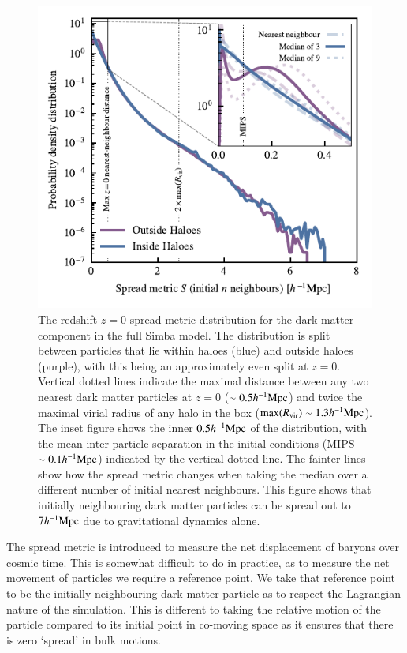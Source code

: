 \documentclass[fleqn,usenatbib]{mnras}
\newcommand{\hmpc}{h^{-1}{\rm Mpc}}
\newcommand{\simba}{{\sc Simba}}
\begin{document}
\begin{figure}
    \centering
    \includegraphics{figures/s50j7kAHF/dark_matter_distance_figure_s50j7k_AHF_updated.pdf}
    \vspace{-0.7cm}
    \caption{The redshift $z=0$ spread metric distribution for the dark
    matter component in the full \simba{} model. The distribution is split
    between particles that lie within haloes (blue) and outside haloes
    (purple), with this being an approximately even split at $z=0$. Vertical
    dotted lines indicate the maximal distance between any two nearest dark
    matter particles at $z=0$ ($\sim 0.5\hmpc{}$) and twice the maximal
    virial radius of any halo in the box (${\rm max}(R_{\rm vir}) \sim
    1.3\hmpc{}$). The inset figure shows the inner $0.5\hmpc{}$ of the
    distribution, with the mean inter-particle separation in the initial
    conditions (MIPS $\sim 0.1\hmpc$) indicated by the vertical dotted line.
    The fainter lines show how the spread metric changes when taking the
    median over a different number of initial nearest neighbours.
    This figure shows that initially neighbouring dark matter particles
    can be spread out to $7\hmpc{}$ due to gravitational dynamics alone.}
    \label{fig:dmonlyspread}
\end{figure}


The spread metric is introduced to measure the net displacement of baryons over
cosmic time. This is somewhat difficult to do in practice, as to measure the
net movement of particles we require a reference point. We take that
reference point to be the initially neighbouring dark matter particle as to
respect the Lagrangian nature of the simulation. This is different to taking the
relative motion of the particle compared to its initial point in co-moving space
as it ensures that there is zero `spread' in bulk motions.
\end{document}
